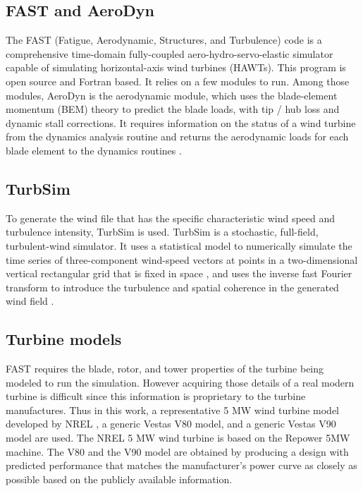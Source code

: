 \documentclass{umthesis}
\begin{document}
\subsection{FAST and AeroDyn}
The FAST (Fatigue, Aerodynamic, Structures, and Turbulence) code is a comprehensive time-domain fully-coupled aero-hydro-servo-elastic simulator capable of simulating horizontal-axis wind turbines (HAWTs). This program is open source and Fortran based. It relies on a few modules to run.  Among those modules, AeroDyn is the aerodynamic module, which uses the blade-element momentum (BEM) theory to predict the blade loads, with tip / hub loss and dynamic stall corrections. It requires information on the status of a wind turbine from the dynamics analysis routine and returns the aerodynamic loads for each blade element to the dynamics routines \cite{FAST}.


\subsection{TurbSim}
To generate the wind file that has the specific characteristic wind speed and turbulence intensity, TurbSim is used. TurbSim is a stochastic, full-field, turbulent-wind simulator. It uses a statistical model to numerically simulate the time series of three-component wind-speed vectors at points in a two-dimensional vertical rectangular grid that is fixed in space \cite{Turbsim}, and uses the inverse fast Fourier transform to introduce the turbulence and spatial coherence in the generated wind field \cite{Shinozuka}.


\subsection{Turbine models}
FAST requires the blade, rotor, and tower properties of the turbine being modeled to run the simulation. However acquiring those details of a real modern turbine is difficult since this information is proprietary to the turbine manufactures. Thus in this work, a representative 5 MW wind turbine model developed by NREL \cite{NREL5MW}, a generic Vestas V80 model, and a generic Vestas V90 model \cite{Churchfield_turbine} are used. The NREL 5 MW wind turbine is based on the Repower 5MW machine. The V80 and the V90 model are obtained by producing a design with predicted performance that matches the manufacturer’s power curve as closely as possible based on the publicly available information.
\end{document}
